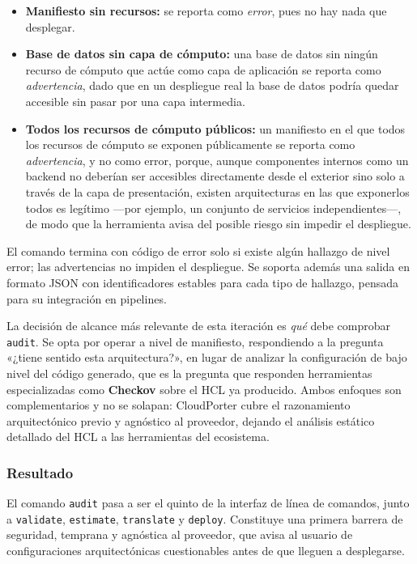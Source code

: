\begin{itemize}
    \item \textbf{Manifiesto sin recursos:} se reporta como \textit{error}, pues no hay nada
    que desplegar.
    \item \textbf{Base de datos sin capa de cómputo:} una base de datos sin ningún recurso de
    cómputo que actúe como capa de aplicación se reporta como \textit{advertencia}, dado que en
    un despliegue real la base de datos podría quedar accesible sin pasar por una capa intermedia.
    \item \textbf{Todos los recursos de cómputo públicos:} un manifiesto en el que todos los
    recursos de cómputo se exponen públicamente se reporta como \textit{advertencia}, y no como
    error, porque, aunque componentes internos como un backend no deberían ser accesibles
    directamente desde el exterior sino solo a través de la capa de presentación, existen
    arquitecturas en las que exponerlos todos es legítimo —por ejemplo, un conjunto de servicios
    independientes—, de modo que la herramienta avisa del posible riesgo sin impedir el despliegue.
\end{itemize}

El comando termina con código de error solo si existe algún hallazgo de
nivel error; las advertencias no impiden el despliegue. Se soporta además una salida en formato
JSON con identificadores estables para cada tipo de hallazgo, pensada para su integración en
pipelines.

La decisión de alcance más relevante de esta iteración es \textit{qué} debe comprobar
\texttt{audit}. Se opta por operar a nivel de manifiesto, respondiendo a la pregunta «¿tiene
sentido esta arquitectura?», en lugar de analizar la configuración de bajo nivel del código
generado, que es la pregunta que responden herramientas especializadas como \textbf{Checkov}
sobre el HCL ya producido. Ambos enfoques son complementarios y no se solapan: CloudPorter cubre
el razonamiento arquitectónico previo y agnóstico al proveedor, dejando el análisis estático
detallado del HCL a las herramientas del ecosistema.

\subsubsection{Resultado}

El comando \texttt{audit} pasa a ser el quinto de la interfaz de línea de comandos, junto a
\texttt{validate}, \texttt{estimate}, \texttt{translate} y \texttt{deploy}. Constituye una
primera barrera de seguridad, temprana y agnóstica al proveedor, que avisa al usuario de
configuraciones arquitectónicas cuestionables antes de que lleguen a desplegarse.

